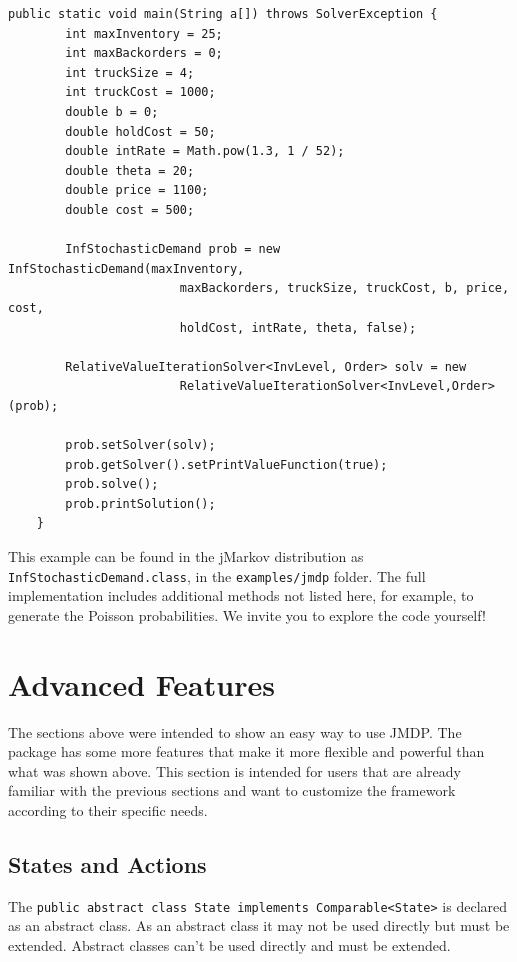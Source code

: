 \documentclass[11pt]{article}
\begin{document}
  \begin{lstlisting}
public static void main(String a[]) throws SolverException {
        int maxInventory = 25;
        int maxBackorders = 0;
        int truckSize = 4;
        int truckCost = 1000;
        double b = 0;
        double holdCost = 50;
        double intRate = Math.pow(1.3, 1 / 52);
        double theta = 20;
        double price = 1100;
        double cost = 500;

        InfStochasticDemand prob = new InfStochasticDemand(maxInventory, 
        				maxBackorders, truckSize, truckCost, b, price, cost, 
        				holdCost, intRate, theta, false);

        RelativeValueIterationSolver<InvLevel, Order> solv = new 
        				RelativeValueIterationSolver<InvLevel,Order>(prob);

        prob.setSolver(solv);
        prob.getSolver().setPrintValueFunction(true);
        prob.solve();
        prob.printSolution();
    }
\end{lstlisting}

This example can be found in the jMarkov distribution as \lstinline!InfStochasticDemand.class!, in the \lstinline!examples/jmdp! folder. The full implementation includes additional methods not listed here, for example, to generate the Poisson probabilities. We invite you to explore the code yourself!

\section{Advanced Features}

The sections above were intended to show an easy way to use JMDP. The package has some more features that make it more flexible and powerful than what was shown above. This section is intended for users that are already familiar with the previous sections and want to customize the framework according to their specific needs.

\subsection{States and Actions}
The \lstinline!public abstract class State implements Comparable<State>! is declared as an abstract class. As an abstract class it may not be used directly but must be extended. Abstract classes can't be used directly and must be extended.
\end{document}
